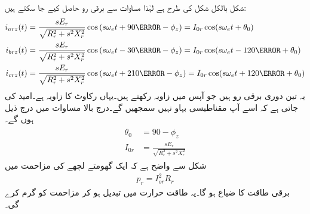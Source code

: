 شکل  بالکل شکل   کی طرح ہے لہٰذا مساوات   سے برقی رو حاصل کیے جا سکتے ہیں:
\begin{gather}
\begin{aligned}
i_{arz}(t)&=\frac{s E_r}{\sqrt{R_r^2+s^2 X_r^2}} \cos \left(s \omega_e t +90\degree-\phi_z \right)=I_{0r} \cos (s \omega_e t +\theta_0)\\
i_{brz}(t)&=\frac{s E_r}{\sqrt{R_r^2+s^2 X_r^2}} \cos \left(s \omega_e t -30\degree-\phi_z \right)=I_{0r} \cos (s \omega_e t -120 \degree+\theta_0)\\
i_{crz}(t)&=\frac{s E_r}{\sqrt{R_r^2+s^2 X_r^2}} \cos \left(s \omega_e t +210\degree-\phi_z \right)=I_{0r} \cos (s \omega_e t+120\degree +\theta_0)
\end{aligned}
\end{gather}
یہ تین دوری برقی رو ہیں جو آپس میں   زاویہ رکھتے ہیں۔یہاں  رکاوٹ کا زاویہ ہے۔امید کی جاتی ہے کہ اسے آپ مقناطیسی بہاو نہیں سمجھیں گے۔درج بالا مساوات میں درج ذیل ہوں گے۔
\begin{gather}
\begin{aligned}\label{مساوات_امالی_گھومتا_رو}
\theta_0&=90-\phi_z \\
I_{0r}&=\frac{s E_r}{\sqrt{R_r^2+s^2 X_r^2}}
\end{aligned}
\end{gather}
شکل   سے واضح ہے کہ ایک گھومتے لچھے کی مزاحمت میں 
\begin{align}\label{مساوات_امالی_طاقت_ضیاع_گھمتا_حصہ}
p_r =I_{or}^2 R_r
\end{align}
برقی طاقت کا ضیاع ہو گا۔یہ طاقت حرارت میں تبدیل ہو کر  مزاحمت کو گرم کرے گی۔


